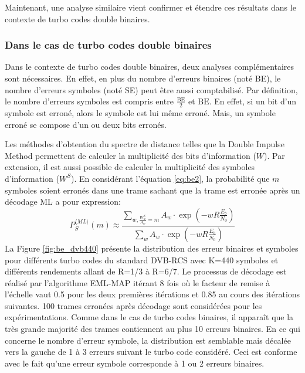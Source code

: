 Maintenant, une analyse similaire vient confirmer et étendre ces résultats dans le contexte de turbo codes double binaires.

\subsubsection{Dans le cas de turbo codes double binaires}
Dans le contexte de turbo codes double binaires, deux analyses complémentaires sont nécessaires. En effet, en plus du 
nombre d'erreurs binaires (noté BE), le nombre d'erreurs symboles (noté SE) peut être aussi comptabilisé. Par définition, 
le nombre d'erreurs symboles est compris entre $\frac{\text{BE}}{2} $ et $\text{BE}$. En effet, si un bit d'un symbole 
est erroné, alors le symbole est lui même erroné. Mais, un symbole erroné se compose d'un ou deux bits erronés.

Les méthodes d'obtention du spectre de distance telles que la Double Impulse Method permettent de calculer la multiplicité 
des bits d'information ($W$). Par extension, il est aussi possible de calculer la multiplicité des symboles d'information
($W^S$). En considérant l'équation \ref{eq:be2}, la probabilité que $m$ symboles soient erronés dans une trame sachant 
que la trame est erronée après un décodage ML a pour expression: 
\begin{equation}
P_S^{\langle ML\rangle}(m) \approx \frac{\displaystyle\sum\limits_{w, \frac{W^S_w}{A_w}=m} A_w\cdot \exp\left(-w R \frac{E_b}{N_0}\right)}
                  {\displaystyle\sum\limits_{w} A_w\cdot \exp\left(-w R \frac{E_b}{N_0}\right)}
\label{eq:se}
\end{equation}
La Figure \ref{fig:be_dvb440} présente la distribution des erreur binaires et symboles pour différents turbo codes du 
standard DVB-RCS avec K=440 symboles et différents rendements allant de R=1/3 à R=6/7. Le processus de décodage est réalisé par
l'algorithme EML-MAP itérant 8 fois où le facteur de remise à l'échelle vaut 0.5 pour les deux premières itérations et 0.85 
au cours des itérations suivantes. 100 trames erronées après décodage sont considérées pour les expérimentations. Comme 
dans le cas de turbo codes 
binaires, il apparaît que la très grande majorité des trames contiennent au plus 10 erreurs binaires. En ce qui concerne 
le nombre d'erreur symbole, la distribution est semblable mais décalée vers la gauche de 1 à 3 erreurs suivant le turbo 
code considéré. Ceci est conforme avec le fait qu'une erreur symbole corresponde à 1 ou 2 erreurs binaires. 

